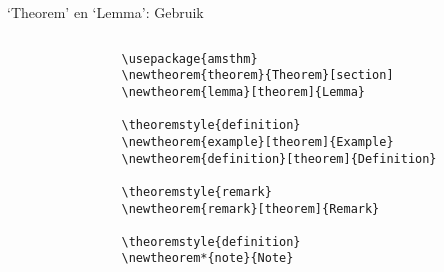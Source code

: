 \copyrightVincent

\begin{frame}[fragile]{`Theorem' en `Lemma': Gebruik}
    \begin{columns}
        \begin{column}{0.4\textwidth}
            \begin{verbatim}
                \usepackage{amsthm}
                \newtheorem{theorem}{Theorem}[section]
                \newtheorem{lemma}[theorem]{Lemma}

                \theoremstyle{definition}
                \newtheorem{example}[theorem]{Example}
                \newtheorem{definition}[theorem]{Definition}

                \theoremstyle{remark}
                \newtheorem{remark}[theorem]{Remark}

                \theoremstyle{definition}
                \newtheorem*{note}{Note}
            \end{verbatim}
        \end{column}
        \begin{column}{0.4\textwidth}
        \end{column}
    \end{columns}
\end{frame}


